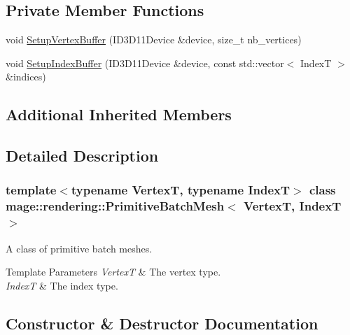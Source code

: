 \subsection*{Private Member Functions}
\begin{DoxyCompactItemize}
\item 
void \hyperlink{classmage_1_1rendering_1_1_primitive_batch_mesh_abb8ba052c2f1453f2bd232d787d9a13d}{Setup\+Vertex\+Buffer} (I\+D3\+D11\+Device \&device, size\+\_\+t nb\+\_\+vertices)
\item 
void \hyperlink{classmage_1_1rendering_1_1_primitive_batch_mesh_abe1802b8f201be6ced30199fbce6e852}{Setup\+Index\+Buffer} (I\+D3\+D11\+Device \&device, const std\+::vector$<$ IndexT $>$ \&indices)
\end{DoxyCompactItemize}
\subsection*{Additional Inherited Members}


\subsection{Detailed Description}
\subsubsection*{template$<$typename VertexT, typename IndexT$>$\newline
class mage\+::rendering\+::\+Primitive\+Batch\+Mesh$<$ Vertex\+T, Index\+T $>$}

A class of primitive batch meshes.


\begin{DoxyTemplParams}{Template Parameters}
{\em VertexT} & The vertex type. \\
\hline
{\em IndexT} & The index type. \\
\hline
\end{DoxyTemplParams}


\subsection{Constructor \& Destructor Documentation}
\hypertarget{classmage_1_1rendering_1_1_primitive_batch_mesh_aa01b243a0ccb0ed4835c4dcab994d030}{}\label{classmage_1_1rendering_1_1_primitive_batch_mesh_aa01b243a0ccb0ed4835c4dcab994d030} 
